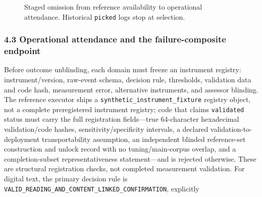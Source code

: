 \documentclass[
  11pt]{article}
\begin{document}
\begin{figure}[htbp]
\centering
{}
\caption{Staged omission from reference availability to operational attendance. Historical \texttt{picked} logs stop at selection.}
\label{fig:omission-stages}
\end{figure}

\subsubsection{4.3 Operational attendance and the failure-composite
endpoint}\label{operational-attendance-and-the-failure-composite-endpoint}

Before outcome unblinding, each domain must freeze an instrument
registry: instrument/version, raw-event schema, decision rule,
thresholds, validation data and code hash, measurement error,
alternative instruments, and assessor blinding. The reference executor
ships a \texttt{synthetic\_instrument\_fixture} registry object, not a
complete preregistered instrument registry; code that claims
\texttt{validated} status must carry the full registration fields---true
64-character hexadecimal validation/code hashes, sensitivity/specificity
intervals, a declared validation-to-deployment transportability
assumption, an independent blinded reference-set construction and unlock
record with no tuning/main-corpus overlap, and a completion-subset
representativeness statement---and is rejected otherwise. These are
structural registration checks, not completed measurement validation.
For digital text, the primary decision rule is
\texttt{VALID\_READING\_AND\_CONTENT\_LINKED\_CONFIRMATION}, explicitly
\end{document}
